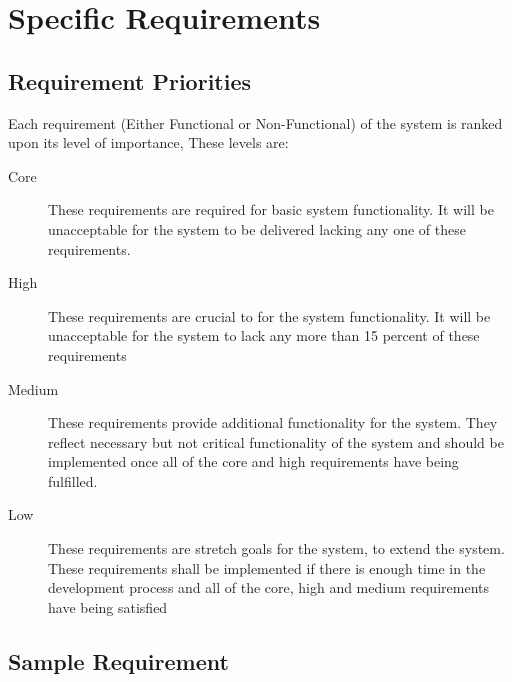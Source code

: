 
\chapter{Specific Requirements} %

\label{Part7Chapter3} %


\section{Requirement Priorities}

Each requirement (Either Functional or Non-Functional) of the system is ranked upon its level of importance, These levels are:

\begin{description}
    \item[Core] These requirements are required for basic system functionality. It will be unacceptable for the system to be delivered lacking any one of these requirements.
    \item[High] These requirements are crucial to for the system functionality. It will be unacceptable for the system to lack any more than 15 percent of these requirements
    \item[Medium] These requirements provide additional functionality for the system. They reflect necessary but not critical functionality of the system and should be implemented once all of the core and high requirements have being fulfilled.
    \item[Low] These requirements are stretch goals for the system, to extend the system. These requirements shall be implemented if there is enough time in the development process and all of the core, high and medium requirements have being satisfied
\end{description}

\section{Sample Requirement}

